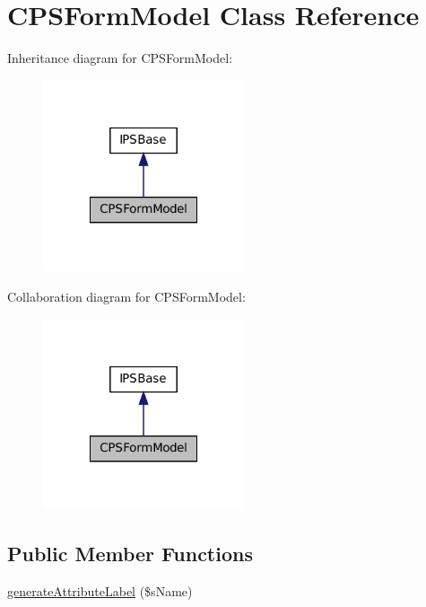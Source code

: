 \hypertarget{classCPSFormModel}{
\section{CPSFormModel Class Reference}
\label{classCPSFormModel}
}


Inheritance diagram for CPSFormModel:\nopagebreak
\begin{figure}[H]
\begin{center}
\leavevmode
\includegraphics[width=168pt]{classCPSFormModel__inherit__graph}
\end{center}
\end{figure}


Collaboration diagram for CPSFormModel:\nopagebreak
\begin{figure}[H]
\begin{center}
\leavevmode
\includegraphics[width=168pt]{classCPSFormModel__coll__graph}
\end{center}
\end{figure}
\subsection*{Public Member Functions}
\begin{DoxyCompactItemize}
\item 
\hyperlink{classCPSFormModel_aee4a8999596f4904b694b68ef0ec1cf2}{generateAttributeLabel} (\$sName)
\end{DoxyCompactItemize}


